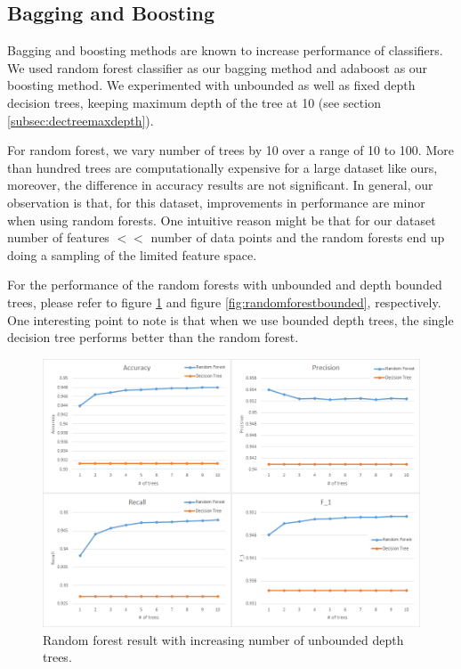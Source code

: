 \documentclass[letterpaper,12pt]{article}
\begin{document}
\subsection{Bagging and Boosting}

Bagging and boosting methods are known to increase performance of classifiers. We used random forest classifier as our bagging method and adaboost as our boosting method. We experimented with unbounded as well as fixed depth decision trees, keeping maximum depth of the tree at 10 (see section \ref{subsec:dectreemaxdepth}). 

For random forest, we vary number of trees by 10 over a range of 10 to 100. More than hundred trees are computationally expensive for a large dataset like ours, moreover, the difference in accuracy results are not significant. In general, our observation is that, for this dataset, improvements in performance are minor when using random forests. One intuitive reason might be that for our dataset number of features $<<$ number of data points and the random forests end up doing a sampling of the limited feature space.

For the performance of the random forests with unbounded and depth bounded trees, please refer to figure \ref{fig:randomforestunbounded}  and figure \ref{fig:randomforestbounded}, respectively. One interesting point to note is that when we use bounded depth trees, the single decision tree performs better than the random forest.

\begin{figure}[ht!]
\includegraphics[width=\textwidth]{images/RF.png}
\caption{Random forest result with increasing number of unbounded depth  trees.}\label{fig:randomforestunbounded}
\end{figure}
\end{document}
